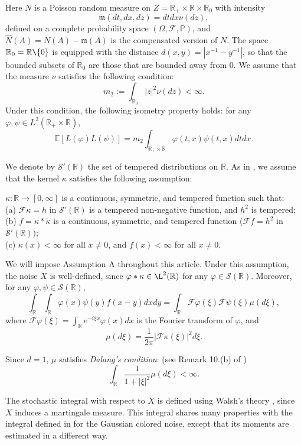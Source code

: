 \documentclass[12pt]{article}
\def\cF{\mathcal{F}}
\def\cS{\mathcal{S}}
\def\bE{\mathbb{E}}
\def\bP{\mathbb{P}}
\def\bR{\mathbb{R}}
\def\k{\kappa}
\newcommand{\fm}{\mathfrak{m}}
\begin{document}
Here $N$ is a Poisson random measure on $Z=\bR_{+}\times \bR \times \bR_0$ with intensity 
\[
\fm(dt,dx,dz)=dt dx \nu(dz),
\] 
defined on a complete probability space $(\Omega,\cF,\bP)$, and  $\widehat{N}(A)=N(A)-\fm(A)$ is the compensated version of $N$.
The space $\bR_0=\bR \verb2\2 \{0\}$ is equipped with the distance $d(x,y)=|x^{-1}-y^{-1}|$, so that the bounded subsets of $\bR_0$ are those that are bounded away from 0.
We assume that the measure $\nu$ satisfies the following condition:
\[
m_2:=\int_{\bR_0}|z|^2 \nu(dz)<\infty.
\]
Under this condition, the following isometry property holds: for any $\varphi,\psi \in L^2(\bR_{+}\times \bR)$,
\[
\bE[L(\varphi)L(\psi)]=m_2 \int_{\bR_+ \times \bR} \varphi(t,x)\psi(t,x)dtdx.
\]

We denote by $\cS'(\bR)$ the set of tempered distributions on $\bR$.
As in \cite{BJ25}, we assume that the kernel $\k$ satisfies the following assumption:

\medskip

$\k:\bR \to [0,\infty]$ is a continuous, symmetric, and tempered function such that:\\
(a) $\cF\k=h$ in $\cS'(\bR)$ is a tempered non-negative function, and $h^2$ is tempered;\\
(b) $f=\k* \widetilde{\k}$ is a continuous, symmetric, and tempered function ($\cF f=h^2$ in $\cS'(\bR))$;\\
(c)  $\k(x)<\infty$ for all $x\not=0$, and $f(x)<\infty$ for all $x\not=0$.

\medskip

We will impose Assumption A throughout this article.
Under this assumption, the noise $X$ is well-defined, since $\varphi*\k \in \L^2(\bR)$ for any $\varphi \in \cS(\bR)$. Moreover, for any $\varphi,\psi \in \cS(\bR)$,
\[
\int_{\bR} \int_{\bR}\varphi(x)\psi(y) f(x-y)dxdy=\int_{\bR} \cF \varphi(\xi) \overline{\cF \psi(\xi)} \mu(d\xi),
\]
where $\cF \varphi(\xi)=\int_{\bR}e^{-i \xi x} \varphi(x) dx$ is the Fourier transform of $\varphi$, and
\begin{equation}
\label{def-mu}
\mu(d\xi)=\frac{1}{2\pi} |\cF \k(\xi)|^2 d\xi.
\end{equation}

Since $d=1$, $\mu$ satisfies {\em Dalang's condition}: (see Remark 10.(b) of \cite{dalang99})
\[
\int_{\bR}\frac{1}{1+|\xi|^2}\mu(d\xi)<\infty.
\]



\medskip


The stochastic integral with respect to $X$ is defined using Walsh's theory \cite{walsh86}, 
since $X$ induces a martingale measure. This integral shares many properties with the integral defined in \cite{dalang99} for the Gaussian colored noise, except that its moments are estimated in a different way.
\end{document}
